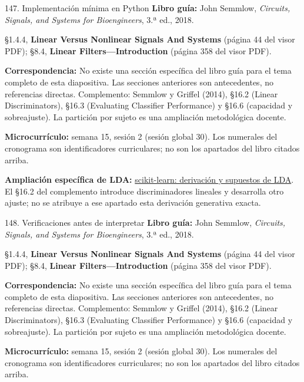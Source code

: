 \documentclass[
  10pt,
  ignorenonframetext,
  aspectratio=169,
  spanish,
]{beamer}
\begin{document}
\begin{frame}{147. Implementación mínima en Python}
\label{implementaciuxf3n-muxednima-en-python-9}
\textbf{Libro guía:} John Semmlow, \emph{Circuits, Signals, and Systems
for Bioengineers}, 3.ª ed., 2018.

§1.4.4, \textbf{Linear Versus Nonlinear Signals And Systems} (página 44
del visor PDF); §8.4, \textbf{Linear Filters---Introduction} (página 358
del visor PDF).

\textbf{Correspondencia:} No existe una sección específica del libro
guía para el tema completo de esta diapositiva. Las secciones anteriores
son antecedentes, no referencias directas. Complemento: Semmlow y
Griffel (2014), §16.2 (Linear Discriminators), §16.3 (Evaluating
Classifier Performance) y §16.6 (capacidad y sobreajuste). La partición
por sujeto es una ampliación metodológica docente.

\textbf{Microcurrículo:} semana 15, sesión 2 (sesión global 30). Los
numerales del cronograma son identificadores curriculares; no son los
apartados del libro citados arriba.

\textbf{Ampliación específica de LDA:}
\href{https://scikit-learn.org/stable/modules/lda_qda.html}{scikit-learn:
derivación y supuestos de LDA}. El §16.2 del complemento introduce
discriminadores lineales y desarrolla otro ajuste; no se atribuye a ese
apartado esta derivación generativa exacta.
\end{frame}

\begin{frame}{148. Verificaciones antes de interpretar}
\label{verificaciones-antes-de-interpretar-9}
\textbf{Libro guía:} John Semmlow, \emph{Circuits, Signals, and Systems
for Bioengineers}, 3.ª ed., 2018.

§1.4.4, \textbf{Linear Versus Nonlinear Signals And Systems} (página 44
del visor PDF); §8.4, \textbf{Linear Filters---Introduction} (página 358
del visor PDF).

\textbf{Correspondencia:} No existe una sección específica del libro
guía para el tema completo de esta diapositiva. Las secciones anteriores
son antecedentes, no referencias directas. Complemento: Semmlow y
Griffel (2014), §16.2 (Linear Discriminators), §16.3 (Evaluating
Classifier Performance) y §16.6 (capacidad y sobreajuste). La partición
por sujeto es una ampliación metodológica docente.

\textbf{Microcurrículo:} semana 15, sesión 2 (sesión global 30). Los
numerales del cronograma son identificadores curriculares; no son los
apartados del libro citados arriba.
\end{frame}
\end{document}
